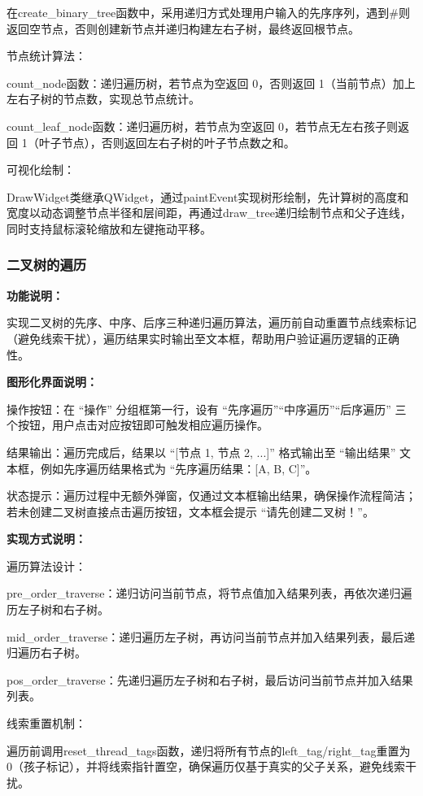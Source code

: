 \documentclass[12pt,a4paper]{article}
\begin{document}
在create\_binary\_tree函数中，采用递归方式处理用户输入的先序序列，遇到\#则返回空节点，否则创建新节点并递归构建左右子树，最终返回根节点。

节点统计算法：

count\_node函数：递归遍历树，若节点为空返回 0，否则返回 1（当前节点）加上左右子树的节点数，实现总节点统计。

count\_leaf\_node函数：递归遍历树，若节点为空返回 0，若节点无左右孩子则返回 1（叶子节点），否则返回左右子树的叶子节点数之和。

可视化绘制：

DrawWidget类继承QWidget，通过paintEvent实现树形绘制，先计算树的高度和宽度以动态调整节点半径和层间距，再通过draw\_tree递归绘制节点和父子连线，同时支持鼠标滚轮缩放和左键拖动平移。

\subsubsection{二叉树的遍历}

\noindent\textbf{功能说明：}

实现二叉树的先序、中序、后序三种递归遍历算法，遍历前自动重置节点线索标记（避免线索干扰），遍历结果实时输出至文本框，帮助用户验证遍历逻辑的正确性。

\noindent\textbf{图形化界面说明：}

操作按钮：在 “操作” 分组框第一行，设有 “先序遍历”“中序遍历”“后序遍历” 三个按钮，用户点击对应按钮即可触发相应遍历操作。

结果输出：遍历完成后，结果以 “[节点 1, 节点 2, ...]” 格式输出至 “输出结果” 文本框，例如先序遍历结果格式为 “先序遍历结果：[A, B, C]”。

状态提示：遍历过程中无额外弹窗，仅通过文本框输出结果，确保操作流程简洁；若未创建二叉树直接点击遍历按钮，文本框会提示 “请先创建二叉树！”。

\noindent\textbf{实现方式说明：}

遍历算法设计：

pre\_order\_traverse：递归访问当前节点，将节点值加入结果列表，再依次递归遍历左子树和右子树。

mid\_order\_traverse：递归遍历左子树，再访问当前节点并加入结果列表，最后递归遍历右子树。

pos\_order\_traverse：先递归遍历左子树和右子树，最后访问当前节点并加入结果列表。

线索重置机制：

遍历前调用reset\_thread\_tags函数，递归将所有节点的left\_tag/right\_tag重置为 0（孩子标记），并将线索指针置空，确保遍历仅基于真实的父子关系，避免线索干扰。
\end{document}
